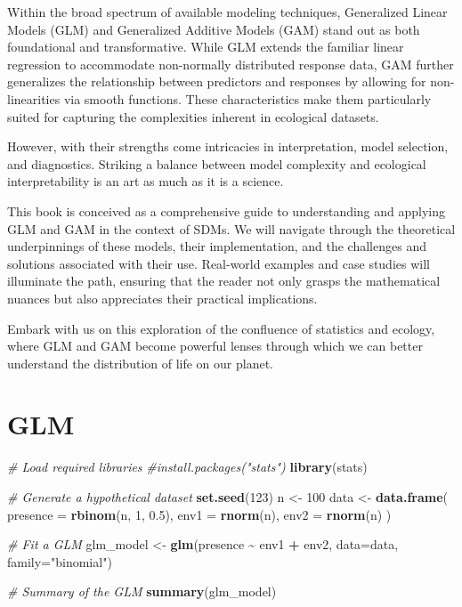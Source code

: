 \documentclass[
]{krantz}
\newenvironment{Shaded}{\begin{snugshade}}{\end{snugshade}}
\newcommand{\AttributeTok}[1]{\textcolor[rgb]{0.27,0.27,0.27}{#1}}
\newcommand{\CommentTok}[1]{\textcolor[rgb]{0.37,0.37,0.37}{\textit{#1}}}
\newcommand{\DecValTok}[1]{\textcolor[rgb]{0.06,0.06,0.06}{#1}}
\newcommand{\FloatTok}[1]{\textcolor[rgb]{0.06,0.06,0.06}{#1}}
\newcommand{\FunctionTok}[1]{\textcolor[rgb]{0.27,0.27,0.27}{\textbf{#1}}}
\newcommand{\NormalTok}[1]{#1}
\newcommand{\OtherTok}[1]{\textcolor[rgb]{0.37,0.37,0.37}{#1}}
\newcommand{\SpecialCharTok}[1]{\textcolor[rgb]{0.43,0.43,0.43}{\textbf{#1}}}
\newcommand{\StringTok}[1]{\textcolor[rgb]{0.5,0.5,0.5}{#1}}
\begin{document}
Within the broad spectrum of available modeling techniques, Generalized Linear Models (GLM) and Generalized Additive Models (GAM) stand out as both foundational and transformative. While GLM extends the familiar linear regression to accommodate non-normally distributed response data, GAM further generalizes the relationship between predictors and responses by allowing for non-linearities via smooth functions. These characteristics make them particularly suited for capturing the complexities inherent in ecological datasets.

However, with their strengths come intricacies in interpretation, model selection, and diagnostics. Striking a balance between model complexity and ecological interpretability is an art as much as it is a science.

This book is conceived as a comprehensive guide to understanding and applying GLM and GAM in the context of SDMs. We will navigate through the theoretical underpinnings of these models, their implementation, and the challenges and solutions associated with their use. Real-world examples and case studies will illuminate the path, ensuring that the reader not only grasps the mathematical nuances but also appreciates their practical implications.

Embark with us on this exploration of the confluence of statistics and ecology, where GLM and GAM become powerful lenses through which we can better understand the distribution of life on our planet.

\hypertarget{glm}{%
\section{GLM}\label{glm}}

\begin{Shaded}
\begin{Highlighting}[]
\CommentTok{\# Load required libraries}
\CommentTok{\#install.packages("stats")}
\FunctionTok{library}\NormalTok{(stats)}

\CommentTok{\# Generate a hypothetical dataset}
\FunctionTok{set.seed}\NormalTok{(}\DecValTok{123}\NormalTok{)}
\NormalTok{n }\OtherTok{\textless{}{-}} \DecValTok{100}
\NormalTok{data }\OtherTok{\textless{}{-}} \FunctionTok{data.frame}\NormalTok{(}
  \AttributeTok{presence =} \FunctionTok{rbinom}\NormalTok{(n, }\DecValTok{1}\NormalTok{, }\FloatTok{0.5}\NormalTok{),}
  \AttributeTok{env1 =} \FunctionTok{rnorm}\NormalTok{(n),}
  \AttributeTok{env2 =} \FunctionTok{rnorm}\NormalTok{(n)}
\NormalTok{)}

\CommentTok{\# Fit a GLM}
\NormalTok{glm\_model }\OtherTok{\textless{}{-}} \FunctionTok{glm}\NormalTok{(presence }\SpecialCharTok{\textasciitilde{}}\NormalTok{ env1 }\SpecialCharTok{+}\NormalTok{ env2, }\AttributeTok{data=}\NormalTok{data, }\AttributeTok{family=}\StringTok{"binomial"}\NormalTok{)}

\CommentTok{\# Summary of the GLM}
\FunctionTok{summary}\NormalTok{(glm\_model)}
\end{Highlighting}
\end{Shaded}
\end{document}
